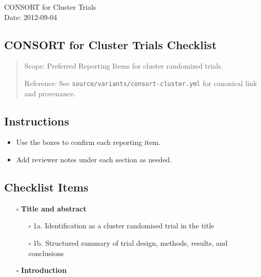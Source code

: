 \documentclass[11pt]{article}
\def\tightlist{}
\begin{document}
\begin{center}
{\LARGE CONSORT for Cluster Trials}\\[4pt]
\normalsize Date: 2012-09-04
\end{center}
\vspace{1em}

\begin{Form}

\section{CONSORT for Cluster Trials
Checklist}\label{consort-for-cluster-trials-checklist}

\begin{quote}
Scope: Preferred Reporting Items for cluster randomized trials.

Reference: See \texttt{source/variants/consort-cluster.yml} for
canonical link and provenance.
\end{quote}

\subsection{Instructions}\label{instructions}

\begin{itemize}
\tightlist
\item
  Use the boxes to confirm each reporting item.
\item
  Add reviewer notes under each section as needed.
\end{itemize}

\subsection{Checklist Items}\label{checklist-items}

\begin{itemize}
\tightlist
\item[$\square$]
  \textbf{Title and abstract}

  \begin{itemize}
  \tightlist
  \item[$\square$]
    1a. Identification as a cluster randomised trial in the title
  \item[$\square$]
    1b. Structured summary of trial design, methods, results, and
    conclusions
  \end{itemize}
\item[$\square$]
  \textbf{Introduction}


\end{itemize}
\end{Form}
\end{document}
